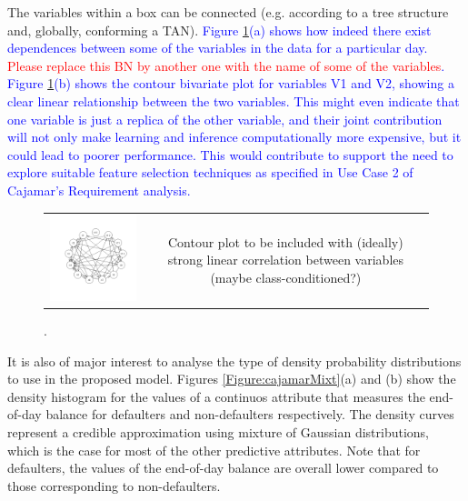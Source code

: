 The variables within a box can be connected (e.g. according to a tree structure and, globally, conforming a TAN). \textcolor{blue}{Figure \ref{Figure:cajamarDependences}(a) shows how indeed there exist dependences between some of the variables in the data for a particular day. \textcolor{red}{Please replace this BN by another one with the name of some of the variables}. Figure \ref{Figure:cajamarDependences}(b) shows the contour bivariate plot for variables V1 and V2, showing a clear linear relationship between the two variables. This might even indicate that one variable is just a replica of the other variable, and their joint contribution will not only make learning and inference computationally more expensive, but it could lead to poorer performance. This would contribute to support the need to explore suitable feature selection techniques as specified in Use Case 2 of Cajamar's Requirement analysis.}

\begin{figure}
  \centering
    \begin{tabular}{cc}
    \includegraphics[width=70mm]{figures/CajaMarBayesianNetwork}&
    \begin{minipage}[b]{0.45\linewidth} Contour plot to be included with (ideally) strong linear correlation between variables (maybe class-conditioned?) \end{minipage}\\
  \end{tabular}
    \caption{\label{Figure:cajamarDependences}.}
\end{figure}

It is also of major interest to analyse the type of density probability distributions to use in the proposed model. Figures \ref{Figure:cajamarMixt}(a) and (b) show the density histogram for the values of a continuos attribute that measures the end-of-day balance for defaulters and non-defaulters respectively. The density curves represent a credible approximation using mixture of Gaussian distributions, which is the case for most of the other predictive attributes. Note that for defaulters, the values of the end-of-day balance are overall lower compared to those corresponding to non-defaulters.

